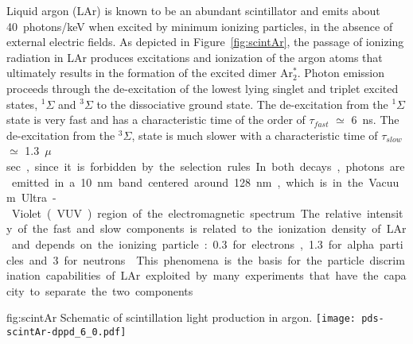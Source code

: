 Liquid argon (LAr) is known to be an abundant scintillator and emits about \SI{40}{photons/keV} when excited  by minimum ionizing particles\cite{Doke:1990rza}, in the absence of external electric fields. As depicted in Figure~\ref{fig:scintAr}, the passage of ionizing radiation in LAr produces excitations and ionization of the argon atoms that ultimately results in the formation of the 
excited dimer Ar$^*_2$.  Photon emission proceeds through the de-excitation 
of the lowest lying singlet and triplet excited states, $^{1}\Sigma$ and 
$^{3}\Sigma$ to the dissociative ground state. The de-excitation from the 
$^{1}\Sigma$ state is very fast and has a characteristic time of the order of 
$\tau_{fast}$ $\simeq$ \SI{6}{ns}. The de-excitation from the $^{3}\Sigma$, state is 
much slower with a characteristic time of $\tau_{slow}$ $\simeq$ \SI{1.3}{$\mu$sec}, 
since it is forbidden by the selection rules. 
In both decays, photons are emitted in a \SI{10}{nm} band centered around \SI{128}{nm}, which is in 
the Vacuum Ultra-Violet (VUV) region of the electromagnetic spectrum.
The relative intensity of the  fast and slow components is related to the ionization density of LAr and 
depends on the ionizing particle: \num{0.3} for electrons, \num{1.3} for alpha 
particles and \num{3} for neutrons. 
This phenomena is the basis for the  particle discrimination capabilities of LAr exploited by many experiments that have the capacity to separate the two components.

\begin{dunefigure}{fig:scintAr}
{Schematic of scintillation light production in argon.}
\texttt{[image: pds-scintAr-dppd\_6\_0.pdf]}
\end{dunefigure}


